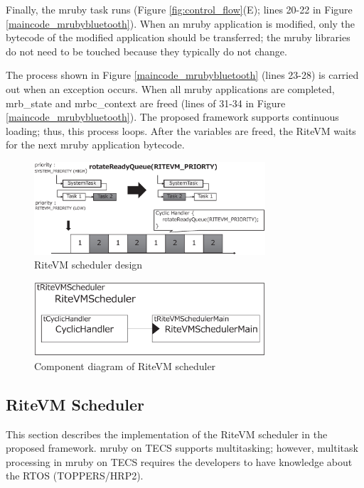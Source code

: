 \documentclass{sig-alternate-05-2015}
\begin{document}
Finally, the mruby task runs (Figure \ref{fig:control_flow}(E); lines 20-22 in Figure \ref{maincode_mrubybluetooth}).
When an mruby application is modified, only the bytecode of the modified application should be transferred; the mruby libraries do not need to be touched because they typically do not change.

The process shown in Figure \ref{maincode_mrubybluetooth} (lines 23-28) is carried out when an exception occurs.
When all mruby applications are completed, mrb\_state and mrbc\_context are freed (lines of 31-34 in Figure \ref{maincode_mrubybluetooth}).
The proposed framework supports continuous loading; thus, this process loops.
After the variables are freed, the RiteVM waits for the next mruby application bytecode.

\begin{figure}[t]
    \centering
    \includegraphics[width=8.6cm,clip]{figure/rotateReadyQueue.eps}
    \vspace{0.5mm}
\caption{RiteVM scheduler design}
    \vspace{1mm}
\label{fig:rotateReadyQueue}
\end{figure} 

\begin{figure}[t]
    \centering
    \includegraphics[width=8.6cm,clip]{figure/cyclic_handler.eps}
\caption{Component diagram of RiteVM scheduler}
    \vspace{1mm}
\label{fig:cyclic_handler}
\end{figure}

\subsection{RiteVM Scheduler}
\label{sec:RiteVM Scheduler}
This section describes the implementation of the RiteVM scheduler in the proposed framework.
mruby on TECS supports multitasking; however, multitask processing in mruby on TECS requires the developers to have knowledge about the RTOS (TOPPERS/HRP2).
\end{document}
